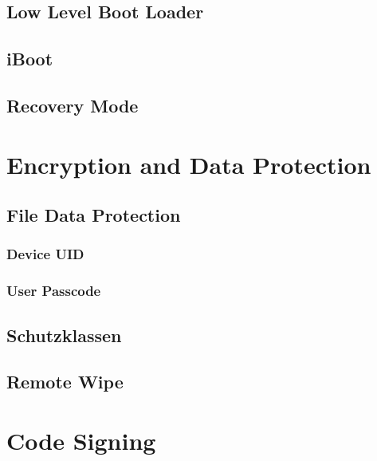\subsection{Low Level Boot Loader}
\label{sec:LowLevelBootLoader1}
\subsection{iBoot}
\label{sec:iBoot1}
\subsection{Recovery Mode}
\label{sec:RecoveryMode}

\section{Encryption and Data Protection}
\label{sec:EncryptionandDataProtection}

\subsection{File Data Protection}
\label{sec:FileDataProtection}
\subsubsection{Device UID}
\label{sec:DeviceUID}
\subsubsection{User Passcode}

\label{sec:UserPasscode}

\subsection{Schutzklassen}
\label{sec:Schutzklassen}

\subsection{Remote Wipe}
\label{sec:RemoteWipe}

\section{Code Signing}
\label{sec:CodeSigning}

